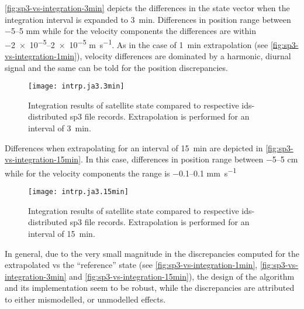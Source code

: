 \autoref{fig:sp3-vs-integration-3min} depicts the differences in the state vector 
when the integration interval is expanded to \SI{3}{\minute}. Differences in 
position range between \numrange{-5}{5} \si{\milli\metre} while for the velocity 
components the differences are within \numrange{-2e-5}{2e-5} \si{\meter\per\second}. As in the 
case of \SI{1}{\minute} extrapolation (see \autoref{fig:sp3-vs-integration-1min}), 
velocity differences are dominated by a harmonic, diurnal signal and the same can 
be told for the position discrepancies.
\begin{figure}
  \centering
  \texttt{[image: intrp.ja3.3min]}
  \caption{Integration results of satellite state compared to respective 
    \gls{ids}-distributed sp3 file records. Extrapolation is performed for an 
    interval of \SI{3}{\minute}.}
  \label{fig:sp3-vs-integration-3min}
\end{figure}

Differences when extrapolating for an interval of \SI{15}{\minute} are depicted 
in \autoref{fig:sp3-vs-integration-15min}. In this case, differences in position 
range between \numrange{-5}{5} \si{\centi\metre} while for the velocity components 
the range is \numrange{-.1}{.1} \si{\milli\meter\per\second}
\begin{figure}
  \centering
  \texttt{[image: intrp.ja3.15min]}
  \caption{Integration results of satellite state compared to respective 
    \gls{ids}-distributed sp3 file records. Extrapolation is performed for an 
    interval of \SI{15}{\minute}.}
  \label{fig:sp3-vs-integration-15min}
\end{figure}

In general, due to the very small magnitude in the discrepancies computed for the 
extrapolated vs the ``reference'' state (see \autoref{fig:sp3-vs-integration-1min}, 
\autoref{fig:sp3-vs-integration-3min} and \autoref{fig:sp3-vs-integration-15min}), 
the design of the algorithm and its implementation seem to be robust, while the 
discrepancies are attributed to either mismodelled, or unmodelled effects.
